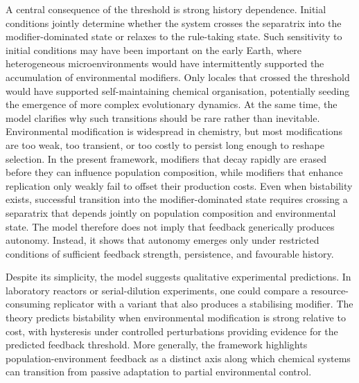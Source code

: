 A central consequence of the threshold is strong history dependence. Initial conditions jointly determine whether the system crosses the separatrix into the modifier-dominated state or relaxes to the rule-taking state. Such sensitivity to initial conditions may have been important on the early Earth, where heterogeneous microenvironments would have intermittently supported the accumulation of environmental modifiers. Only locales that crossed the threshold would have supported self-maintaining chemical organisation, potentially seeding the emergence of more complex evolutionary dynamics. At the same time, the model clarifies why such transitions should be rare rather than inevitable. Environmental modification is widespread in chemistry, but most modifications are too weak, too transient, or too costly to persist long enough to reshape selection. In the present framework, modifiers that decay rapidly are erased before they can influence population composition, while modifiers that enhance replication only weakly fail to offset their production costs. Even when bistability exists, successful transition into the modifier-dominated state requires crossing a separatrix that depends jointly on population composition and environmental state. The model therefore does not imply that feedback generically produces autonomy. Instead, it shows that autonomy emerges only under restricted conditions of sufficient feedback strength, persistence, and favourable history.

Despite its simplicity, the model suggests qualitative experimental predictions. In laboratory reactors or serial-dilution experiments, one could compare a resource-consuming replicator with a variant that also produces a stabilising modifier. The theory predicts bistability when environmental modification is strong relative to cost, with hysteresis under controlled perturbations providing evidence for the predicted feedback threshold. More generally, the framework highlights population-environment feedback as a distinct axis along which chemical systems can transition from passive adaptation to partial environmental control. 

